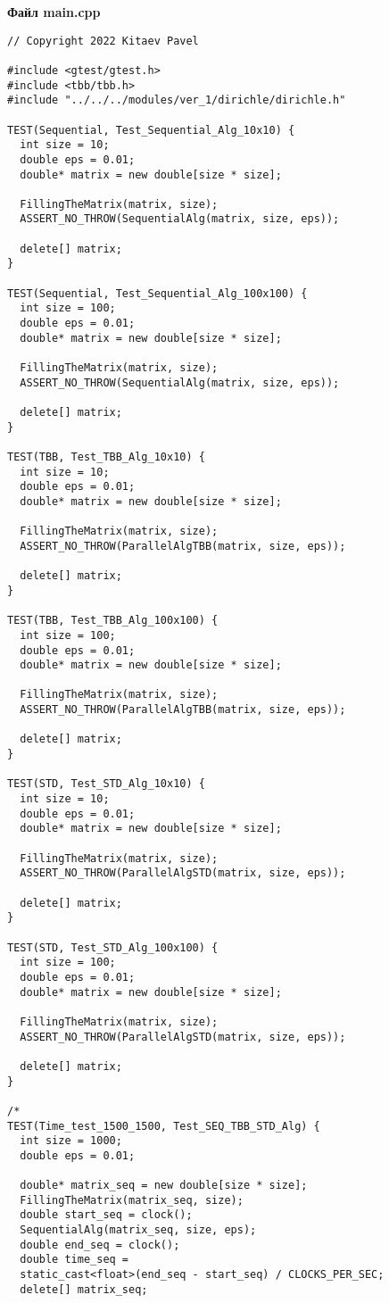 \documentclass{report}
\begin{document}
\newpage

\textbf{ Файл main.cpp }
\begin{lstlisting}
// Copyright 2022 Kitaev Pavel

#include <gtest/gtest.h>
#include <tbb/tbb.h>
#include "../../../modules/ver_1/dirichle/dirichle.h"

TEST(Sequential, Test_Sequential_Alg_10x10) {
  int size = 10;
  double eps = 0.01;
  double* matrix = new double[size * size];

  FillingTheMatrix(matrix, size);
  ASSERT_NO_THROW(SequentialAlg(matrix, size, eps));

  delete[] matrix;
}

TEST(Sequential, Test_Sequential_Alg_100x100) {
  int size = 100;
  double eps = 0.01;
  double* matrix = new double[size * size];

  FillingTheMatrix(matrix, size);
  ASSERT_NO_THROW(SequentialAlg(matrix, size, eps));

  delete[] matrix;
}

TEST(TBB, Test_TBB_Alg_10x10) {
  int size = 10;
  double eps = 0.01;
  double* matrix = new double[size * size];

  FillingTheMatrix(matrix, size);
  ASSERT_NO_THROW(ParallelAlgTBB(matrix, size, eps));

  delete[] matrix;
}

TEST(TBB, Test_TBB_Alg_100x100) {
  int size = 100;
  double eps = 0.01;
  double* matrix = new double[size * size];

  FillingTheMatrix(matrix, size);
  ASSERT_NO_THROW(ParallelAlgTBB(matrix, size, eps));

  delete[] matrix;
}

TEST(STD, Test_STD_Alg_10x10) {
  int size = 10;
  double eps = 0.01;
  double* matrix = new double[size * size];

  FillingTheMatrix(matrix, size);
  ASSERT_NO_THROW(ParallelAlgSTD(matrix, size, eps));

  delete[] matrix;
}

TEST(STD, Test_STD_Alg_100x100) {
  int size = 100;
  double eps = 0.01;
  double* matrix = new double[size * size];

  FillingTheMatrix(matrix, size);
  ASSERT_NO_THROW(ParallelAlgSTD(matrix, size, eps));

  delete[] matrix;
}

/*
TEST(Time_test_1500_1500, Test_SEQ_TBB_STD_Alg) {
  int size = 1000;
  double eps = 0.01;

  double* matrix_seq = new double[size * size];
  FillingTheMatrix(matrix_seq, size);
  double start_seq = clock();
  SequentialAlg(matrix_seq, size, eps);
  double end_seq = clock();
  double time_seq =
  static_cast<float>(end_seq - start_seq) / CLOCKS_PER_SEC;
  delete[] matrix_seq;


\end{lstlisting}
\end{document}
